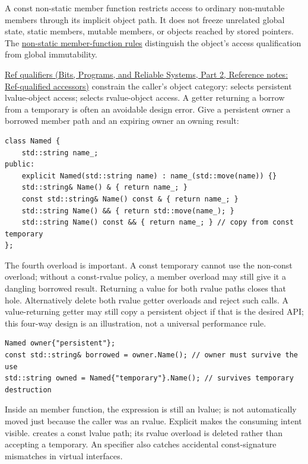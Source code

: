 \hypertarget{05-engine-i-ch003-an-accessor-must-respect-the-callers-lifetime}{}

A const non-static member function restricts access to ordinary non-mutable members through its implicit object path. It does not freeze unrelated global state, static members, mutable members, or objects reached by stored pointers. The \href{https://eel.is/c++draft/class.mfct.non.static}{non-static member-function rules} distinguish the object's access qualification from global immutability.

\href{../01-Bits-Programs-and-Reliable-Systems-P02/main.pdf\#nameddest=appendix-d42039b1d6f7}{Ref qualifiers (Bits, Programs, and Reliable Systems, Part 2, Reference notes: Ref-qualified accessors)} constrain the caller's object category: \BookInlineCode{\&} selects persistent lvalue-object access; \BookInlineCode{\&\&} selects rvalue-object access. A getter returning a borrow from a temporary is often an avoidable design error. Give a persistent owner a borrowed member path and an expiring owner an owning result:

\begin{verbatim}
class Named {
    std::string name_;
public:
    explicit Named(std::string name) : name_(std::move(name)) {}
    std::string& Name() & { return name_; }
    const std::string& Name() const & { return name_; }
    std::string Name() && { return std::move(name_); }
    std::string Name() const && { return name_; } // copy from const temporary
};
\end{verbatim}

The fourth overload is important. A const temporary cannot use the non-const \BookInlineCode{\&\&} overload; without a const-rvalue policy, a  member overload may still give it a dangling borrowed result. Returning a value for both rvalue paths closes that hole. Alternatively delete both rvalue getter overloads and reject such calls. A value-returning getter may still copy a persistent object if that is the desired API; this four-way design is an illustration, not a universal performance rule.

\begin{verbatim}
Named owner{"persistent"};
const std::string& borrowed = owner.Name(); // owner must survive the use
std::string owned = Named{"temporary"}.Name(); // survives temporary destruction
\end{verbatim}

Inside an \BookInlineCode{\&\&} member function, the expression  is still an lvalue;  is not automatically moved just because the caller was an rvalue. Explicit  makes the consuming intent visible.  creates a const lvalue path; its rvalue overload is deleted rather than accepting a temporary. An  specifier also catches accidental const-signature mismatches in virtual interfaces.

